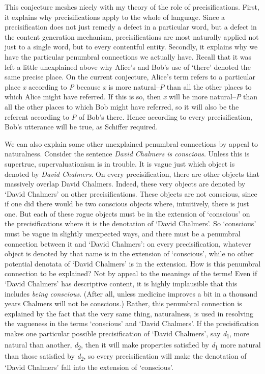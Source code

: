 \documentclass[
  11pt,
  letterpaper,
  DIV=11,
  numbers=noendperiod,
  oneside]{scrartcl}
\begin{document}
This conjecture meshes nicely with my theory of the role of
precisifications. First, it explains why precisifications apply to the
whole of language. Since a precisification does not just remedy a defect
in a particular word, but a defect in the content generation mechanism,
precisifications are most naturally applied not just to a single word,
but to every contentful entity. Secondly, it explains why we have the
particular penumbral connections we actually have. Recall that it was
left a little unexplained above why Alice's and Bob's use of `there'
denoted the same precise place. On the current conjecture, Alice's term
refers to a particular place \emph{x} according to \emph{P} because
\emph{x} is more natural--\emph{P} than all the other places to which
Alice might have referred. If this is so, then \emph{x} will be more
natural--\emph{P} than all the other places to which Bob might have
referred, so it will also be the referent according to \emph{P} of Bob's
there. Hence according to every precisification, Bob's utterance will be
true, as Schiffer required.

We can also explain some other unexplained penumbral connections by
appeal to naturalness. Consider the sentence \emph{David Chalmers is
conscious}. Unless this is supertrue, supervaluationism is in trouble.
It is vague just which object is denoted by \emph{David Chalmers}. On
every precisification, there are other objects that massively overlap
David Chalmers. Indeed, these very objects are denoted by `David
Chalmers' on other precisifications. These objects are not conscious,
since if one did there would be two conscious objects where,
intuitively, there is just one. But each of these rogue objects must be
in the extension of `conscious' on the precisifications where it is the
denotation of `David Chalmers'. So `conscious' must be vague in slightly
unexpected ways, and there must be a penumbral connection between it and
`David Chalmers': on every precisification, whatever object is denoted
by that name is in the extension of `conscious', while no other
potential denotata of `David Chalmers' is in the extension. How is this
penumbral connection to be explained? Not by appeal to the meanings of
the terms! Even if `David Chalmers' has descriptive content, it is
highly implausible that this includes \emph{being conscious}. (After
all, unless medicine improves a bit in a thousand years Chalmers will
not be conscious.) Rather, this penumbral connection is explained by the
fact that the very same thing, naturalness, is used in resolving the
vagueness in the terms `conscious' and `David Chalmers'. If the
precisification makes one particular possible precisification of `David
Chalmers', say \emph{d}\textsubscript{1}, more natural than another,
\emph{d}\textsubscript{2}, then it will make properties satisfied by
\emph{d}\textsubscript{1­} more natural than those satisfied by
\emph{d}\textsubscript{2}, so every precisification will make the
denotation of `David Chalmers' fall into the extension of `conscious'.
\end{document}
